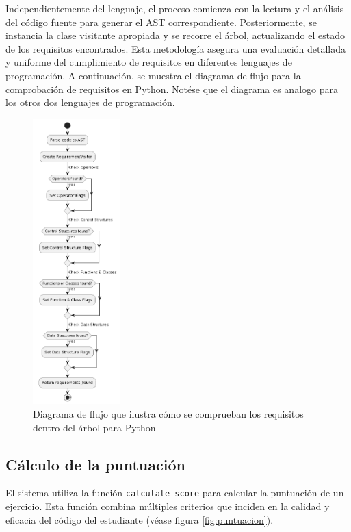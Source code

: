 Independientemente del lenguaje, el proceso comienza con la lectura y el análisis del código fuente para generar el AST correspondiente. Posteriormente, se instancia la clase visitante apropiada y se recorre el árbol, actualizando el estado de los requisitos encontrados. Esta metodología asegura una evaluación detallada y uniforme del cumplimiento de requisitos en diferentes lenguajes de programación. A continuación, se muestra el diagrama de flujo para la comprobación de requisitos en Python. Notése que el diagrama es analogo para los otros dos lenguajes de programación.


\begin{figure}[H]
    \centering
    \includegraphics[width=0.3\textwidth]{imagenes/comprobacionescodigo.png}
    \caption{Diagrama de flujo que ilustra cómo se comprueban los requisitos dentro del árbol para Python}
    \label{fig:arbolrequisios}
\end{figure}


\subsection{Cálculo de la puntuación}

El sistema utiliza la función \texttt{calculate\_score} para calcular la puntuación de un ejercicio. Esta función combina múltiples criterios que inciden en la calidad y eficacia del código del estudiante (véase figura \ref{fig:puntuacion}).

